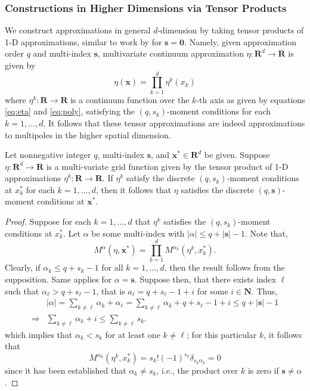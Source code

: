 \subsubsection{Constructions in Higher Dimensions via Tensor Products}

We construct approximations in general $d$-dimension by taking tensor products of 1-D approximations, similar to work by \cite{TorEng:04} for $\mathbf s=\mathbf 0$.
Namely, given approximation order $q$ and multi-index $\mathbf s$, multivariate continuum approximation $\eta:\mathbf R^d\to \mathbf R$ is given by
\begin{equation}\label{eq:tensor_eta}
	\eta(\mathbf x) = \prod_{k=1}^{d} \eta^k(x_k) 
\end{equation}
where $\eta^k:\mathbf R\to \mathbf R$ is a continuum function over the $k$-th axis as given by equations \ref{eq:eta} and \ref{eq:poly}, satisfying the $(q,s_k)$-moment conditions for each $k=1,...,d$.
It follows that these tensor approximations are indeed approximations to multipoles in the higher spatial dimension.

\begin{theorem}\label{thm:prodmomcond}
	Let nonnegative integer $q$, multi-index $\mathbf s$, and $\mathbf x^*\in\mathbf R^d$ be given. 
Suppose $\eta:\mathbf R^d\to\mathbf R$ is a multi-variate grid function given by the tensor product of 1-D approximations $\eta^{k}:\mathbf R\to\mathbf R$.
If $\eta^{k}$ satisfy the discrete $(q,s_k)$-moment conditions at $x^*_k$ for each $k=1,...,d$, then it follows that $\eta$ satisfies the discrete $(q,\mathbf s)$-moment conditions at $\mathbf x^*$.
\end{theorem}

\begin{proof}
Suppose for each $k=1,...,d$ that $\eta^{k}$ satisfies the $(q,s_k)$-moment conditions at $x^*_k$. 
Let $\alpha$ be some multi-index with $|\alpha|\le q+|\mathbf s|-1$. 
Note that,
\[
	M^\alpha(\eta,\mathbf x^*) = \prod_{k=1}^d M^{\alpha_k}(\eta^{k},x^*_k).
\]
Clearly, if $\alpha_k\le q+s_k-1$ for all $k=1,...,d$, then the result follows from the supposition. 
Same applies for $\alpha=\mathbf s$.
Suppose then, that there exists index $\ell$ such that $\alpha_\ell>q+s_\ell-1$, that is $a_\ell=q+s_\ell -1 +i$ for some $i\in\mathbf N$. Thus,
\begin{align*}
	& |\alpha| = \sum_{k\neq \ell} \alpha_k + \alpha_\ell = \sum_{k\neq \ell} \alpha_k + q+s_\ell-1+i \le q + |\mathbf s| -1\\
\Longrightarrow	&  \sum_{k\neq\ell} \alpha_k + i \le \sum_{k\neq \ell} s_k.
\end{align*}
which implies that $\alpha_k<s_k$ for at least one $k\neq\ell$;
for this particular $k$, it follows that 
\[
	M^{\alpha_k}(\eta^{k},x^*_k) = s_k!(-1)^{s_k} \delta_{s_k \alpha_k} = 0
\]
since it has been established that $\alpha_k\neq s_k$, i.e., the product over $k$ is zero if $\mathbf s\neq \alpha$.
\end{proof}


